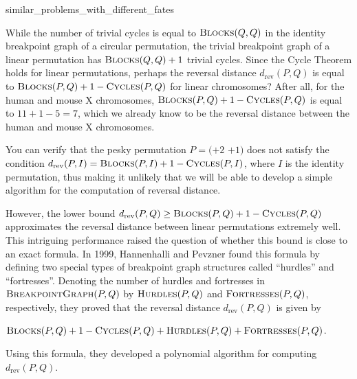\begin{detour}{similar_problems_with_different_fates}
\begin{qbox}\end{qbox}

\noindent While the number of trivial cycles is equal to $\text{\scshape Blocks}(Q, Q)$  in the identity breakpoint graph of a circular permutation,  the trivial breakpoint graph of a linear permutation has $\text{\scshape Blocks}(Q, Q) + 1$ trivial cycles.  Since the Cycle Theorem holds for linear permutations, perhaps the reversal distance $d_{\text{rev}}(P, Q)$ is equal to $\text{\scshape Blocks}(P, Q) + 1 - \text{\scshape Cycles}(P, Q)$ for linear chromosomes?  After all, for the human and mouse X chromosomes, $\text{\scshape Blocks}(P, Q) + 1 - \text{\scshape Cycles}(P, Q)$ is equal to $11 + 1 - 5 = 7$, which we already know to be the reversal distance between the human and mouse X chromosomes.\par

\vspace{\baselineskip}

\begin{qbox}[
Can you modify the proof of the 2-Break Distance Theorem to prove that  $d_{\text{rev}}(P, Q) = \textfunc{Blocks}(P, Q) + 1 - \textfunc{Cycles}(P, Q)$ for linear permutations $P$ and $Q$? 
]\end{qbox}

\noindent You can verify that the pesky permutation $P = (+2$ $+1)$ does not satisfy the condition $d_{\text{rev}}(P, I) = \text{\scshape Blocks}(P, I) + 1 - \text{\scshape Cycles}(P, I)$, where $I$ is the identity permutation, thus making it unlikely that we will be able to develop a simple algorithm for the computation of reversal distance. 

However, the lower bound $d_{\text{rev}}(P,Q) \geq \text{\scshape Blocks}(P, Q) + 1 - \text{\scshape Cycles}(P, Q)$  approximates the reversal distance between linear permutations extremely well. This intriguing performance raised the question of whether this bound is close to an exact formula. In 1999, Hannenhalli and Pevzner found this formula by defining two special types of breakpoint graph structures called ``hurdles'' and ``fortresses''. Denoting the number of hurdles and fortresses in $\text{\scshape BreakpointGraph}(P, Q)$ by $\text{\scshape Hurdles}(P, Q)$ and $\text{\scshape Fortresses}(P, Q)$, respectively, they proved that the reversal distance $d_{\text{rev}}(P, Q)$  is given by

\begin{center}
$\text{\scshape Blocks}(P, Q) + 1 - \text{\scshape Cycles}(P, Q) + \text{\scshape Hurdles}(P, Q) + \text{\scshape Fortresses}(P, Q)$.
\end{center}

\noindent Using this formula, they developed a polynomial algorithm for computing $d_{\text{rev}}(P,Q)$.\\

\end{detour}

